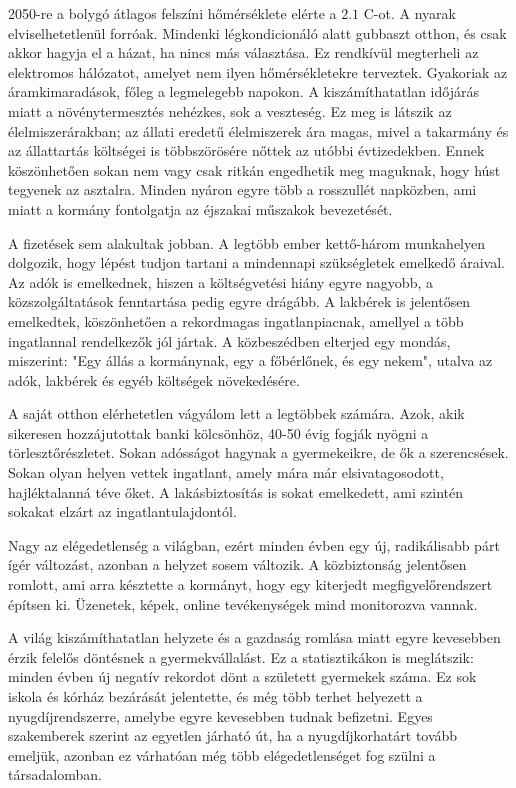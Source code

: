 \begin{displayquote} 2050-re a bolygó átlagos felszíni hőmérséklete elérte a \(2.1\)
	\textdegree C-ot. A nyarak elviselhetetlenül forróak. Mindenki légkondicionáló alatt
	gubbaszt otthon, és csak akkor hagyja el a házat, ha nincs más választása. Ez rendkívül
	megterheli az elektromos hálózatot, amelyet nem ilyen hőmérsékletekre terveztek. Gyakoriak
	az áramkimaradások, főleg a legmelegebb napokon.  A kiszámíthatatlan időjárás miatt a
	növénytermesztés nehézkes, sok a veszteség. Ez meg is látszik az élelmiszerárakban; az
	állati eredetű élelmiszerek ára magas, mivel a takarmány és az állattartás költségei
	is többszörösére nőttek az utóbbi évtizedekben. Ennek köszönhetően sokan nem vagy csak
	ritkán engedhetik meg maguknak, hogy húst tegyenek az asztalra. Minden nyáron egyre több
	a rosszullét napközben, ami miatt a kormány fontolgatja az éjszakai műszakok bevezetését.

	A fizetések sem alakultak jobban. A legtöbb ember kettő-három munkahelyen dolgozik, hogy
	lépést tudjon tartani a mindennapi szükségletek emelkedő áraival. Az adók is emelkednek,
	hiszen a költségvetési hiány egyre nagyobb, a közszolgáltatások fenntartása pedig egyre
	drágább. A lakbérek is jelentősen emelkedtek, köszönhetően a rekordmagas ingatlanpiacnak,
	amellyel a több ingatlannal rendelkezők jól jártak. A közbeszédben elterjed egy mondás,
	miszerint: "Egy állás a kormánynak, egy a főbérlőnek, és egy nekem", utalva az adók,
	lakbérek és egyéb költségek növekedésére.

	A saját otthon elérhetetlen vágyálom lett a legtöbbek számára. Azok, akik sikeresen
	hozzájutottak banki kölcsönhöz, 40-50 évig fogják nyögni a törlesztőrészletet. Sokan
	adósságot hagynak a gyermekeikre, de ők a szerencsések. Sokan olyan helyen vettek ingatlant,
	amely mára már elsivatagosodott, hajléktalanná téve őket. A lakásbiztosítás is sokat
	emelkedett, ami szintén sokakat elzárt az ingatlantulajdontól.

	Nagy az elégedetlenség a világban, ezért minden évben egy új, radikálisabb párt ígér
	változást, azonban a helyzet sosem változik. A közbiztonság jelentősen romlott, ami arra
	késztette a kormányt, hogy egy kiterjedt megfigyelőrendszert építsen ki. Üzenetek, képek,
	online tevékenységek mind monitorozva vannak.

	A világ kiszámíthatatlan helyzete és a gazdaság romlása miatt egyre kevesebben érzik
	felelős döntésnek a gyermekvállalást. Ez a statisztikákon is meglátszik: minden évben új
	negatív rekordot dönt a született gyermekek száma. Ez sok iskola és kórház bezárását
	jelentette, és még több terhet helyezett a nyugdíjrendszerre, amelybe egyre kevesebben tudnak
	befizetni. Egyes szakemberek szerint az egyetlen járható út, ha a nyugdíjkorhatárt tovább
	emeljük, azonban ez várhatóan még több elégedetlenséget fog szülni a társadalomban.
\end{displayquote}